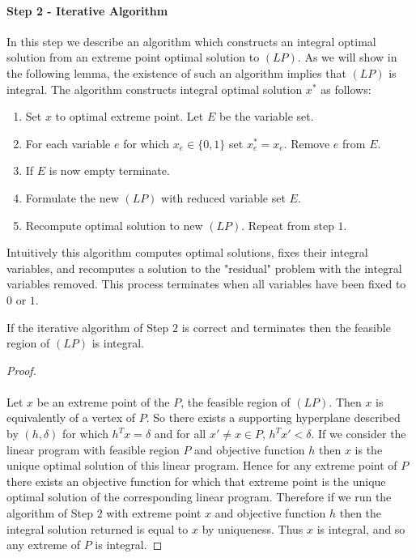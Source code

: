 \paragraph{Step 2 - Iterative Algorithm}
In this step we describe an algorithm which constructs an integral optimal solution from an extreme point optimal solution to $(LP)$. As we will show in the following lemma, the existence of such an algorithm implies that $(LP)$ is integral. The algorithm constructs integral optimal solution $x^*$ as follows:
\begin{enumerate}
\item Set $x$ to optimal extreme point. Let $E$ be the variable set.
\item For each variable $e$ for which $x_e  \in \{0,1\}$ set $x^*_e = x_e$. Remove $e$ from $E$.
\item If $E$ is now empty terminate.
\item Formulate the new $(LP)$ with reduced variable set $E$.
\item Recompute optimal solution to new $(LP)$. Repeat from step $1$.
\end{enumerate}
Intuitively this algorithm computes optimal solutions, fixes their integral variables, and recomputes a solution to the "residual" problem with the integral variables removed. This process terminates when all variables have been fixed to $0$ or $1$.
\begin{lemma} If the iterative algorithm of Step $2$ is correct and terminates then the feasible region of $(LP)$ is integral.
\end{lemma}
\begin{proof}
\paragraph{}
Let $x$ be an extreme point of the $P$, the feasible region of $(LP)$. Then $x$ is equivalently of a vertex of $P$. So there exists a supporting hyperplane described by $(h,\delta)$ for which $h^Tx = \delta$ and for all $x' \neq x \in P$, $h^Tx' < \delta$. If we consider the linear program with feasible region $P$ and objective function $h$ then $x$ is the unique optimal solution of this linear program. Hence for any extreme point of $P$ there exists an objective function for which that extreme point is the unique optimal solution of the corresponding linear program. Therefore if we run the algorithm of Step $2$ with extreme point $x$ and objective function $h$ then the integral solution returned is equal to $x$ by uniqueness. Thus $x$ is integral, and so any extreme of $P$ is integral. 
\end{proof}
